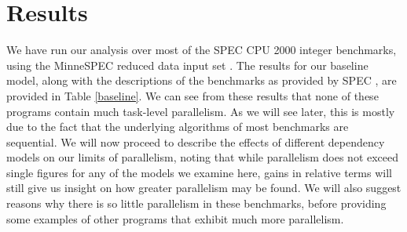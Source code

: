 \section{Results}

We have run our analysis over most of the SPEC CPU 2000 integer benchmarks, using the MinneSPEC reduced data input set \cite{KleinOsowski02minnespec}.
The results for our baseline model, along with the descriptions of the benchmarks as provided by SPEC \cite{henning00spec}, are provided in Table \ref{baseline}.
We can see from these results that none of these programs contain much task-level parallelism.
As we will see later, this is mostly due to the fact that the underlying algorithms of most benchmarks are sequential.
We will now proceed to describe the effects of different dependency models on our limits of parallelism, noting that while parallelism does not exceed single figures for any of the models we examine here, gains in relative terms will still give us insight on how greater parallelism may be found.
We will also suggest reasons why there is so little parallelism in these benchmarks, before providing some examples of other programs that exhibit much more parallelism.

